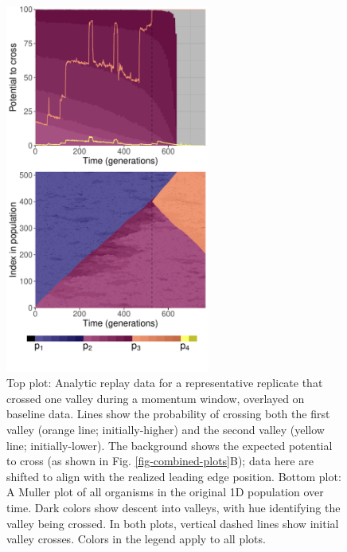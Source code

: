 \begin{figure}[h!]
\begin{center}
\includegraphics[width=0.6\textwidth]{05_adaptive_momentum/media/reps/400/script_06__plot_05__combined_plot_area_palette.pdf}
\caption{
    Top plot: Analytic replay data for a representative replicate that crossed one valley during a momentum window, overlayed on baseline data. 
    Lines show the probability of crossing both the first valley  (orange line; initially-higher) and the second valley (yellow line; initially-lower). 
    The background shows the expected potential to cross (as shown in Fig. \ref{fig-combined-plots}B); data here are shifted to align with the realized leading edge position. 
    Bottom plot: A Muller plot of all organisms in the original 1D population over time. 
    Dark colors show descent into valleys, with hue identifying the valley being crossed. 
    In both plots, vertical dashed lines show initial valley crosses.
    Colors in the legend apply to all plots. 
}
\label{fig-replay-single-cross}
\end{center}
\end{figure}

